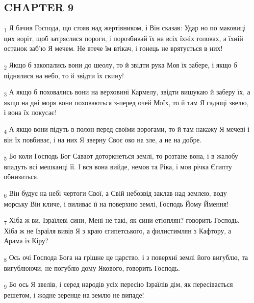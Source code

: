 \subsection{CHAPTER 9}
\begin{tcolorbox}
\textsubscript{1} Я бачив Господа, що стояв над жертівником, і Він сказав: Удар но по маковиці цих воріт, щоб затряслися пороги, і порозбивай їх на всіх їхніх головах, а їхній останок заб'ю Я мечем. Не втече їм втікач, і гонець не врятується в них!
\end{tcolorbox}
\begin{tcolorbox}
\textsubscript{2} Якщо б закопались вони до шеолу, то й звідти рука Моя їх забере, і якщо б піднялися на небо, то й звідти їх скину!
\end{tcolorbox}
\begin{tcolorbox}
\textsubscript{3} А якщо б поховались вони на верховині Кармелу, звідти вишукаю й заберу їх, а якщо на дні моря вони поховаються з-перед очей Моїх, то й там Я гадюці звелю, і вона їх покусає!
\end{tcolorbox}
\begin{tcolorbox}
\textsubscript{4} А якщо вони підуть в полон перед своїми ворогами, то й там накажу Я мечеві і він їх повбиває, і на них Я зверну Своє око на зле, а не на добре.
\end{tcolorbox}
\begin{tcolorbox}
\textsubscript{5} Бо коли Господь Бог Саваот доторкнеться землі, то розтане вона, і в жалобу впадуть всі мешканці її. І вся вона вийде, немов та Ріка, і мов річка Єгипту обнизиться.
\end{tcolorbox}
\begin{tcolorbox}
\textsubscript{6} Він будує на небі чертоги Свої, а Свій небозвід заклав над землею, воду морську Він кличе, і виливає її на поверхню землі, Господь Йому Ймення!
\end{tcolorbox}
\begin{tcolorbox}
\textsubscript{7} Хіба ж ви, Ізраїлеві сини, Мені не такі, як сини етіоплян? говорить Господь. Хіба ж не Ізраїля вивів Я з краю єгипетського, а филистимлян з Кафтору, а Арама із Кіру?
\end{tcolorbox}
\begin{tcolorbox}
\textsubscript{8} Ось очі Господа Бога на грішне це царство, і з поверхні землі його вигублю, та вигублюючи, не погублю дому Якового, говорить Господь.
\end{tcolorbox}
\begin{tcolorbox}
\textsubscript{9} Бо ось Я звелів, і серед народів усіх пересію Ізраїлів дім, як пересівається решетом, і жодне зеренце на землю не випаде!
\end{tcolorbox}
